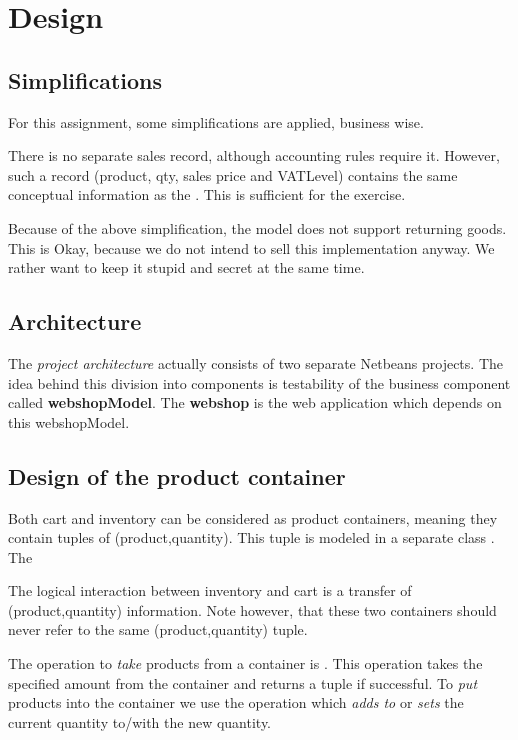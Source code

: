 \section{Design}
\subsection{Simplifications}
For this assignment, some simplifications are applied, business wise.
\begin{itemize*}
\item There is no separate sales record, although accounting rules
  require it. However, such a  record (product, qty, sales
  price and VATLevel) contains the same conceptual information as the
  . This is sufficient for the exercise.
\item Because of the above simplification, the model does not support
  returning goods. This is Okay, because we do not intend to sell this
  implementation anyway. We rather want to keep it stupid and secret
  at the same time.
\end{itemize*}

\subsection{Architecture}
The \textit{project architecture} actually consists of two separate Netbeans projects. 
The idea behind this division into components is testability of
the business component called \textbf{webshopModel}.
The \textbf{webshop} is the web application which depends on this webshopModel. 

\subsection{Design of the product container}
Both cart and inventory can be considered as product containers,
meaning they contain tuples of (product,quantity). 
This tuple is modeled in a separate class . The 

The logical interaction between inventory and cart is a transfer of
(product,quantity) information. Note however, that these two containers
should never refer to the same (product,quantity) tuple.

The operation to \textit{take} products from a container is
. This operation takes the specified amount from
the container and returns a  tuple if successful. 
To \textit{put} products into the container we use the
 operation which \textit{adds to}
or \textit{sets} the current quantity to/with the new quantity. 

